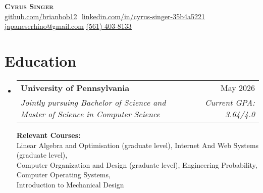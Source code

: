 \documentclass[letterpaper,11pt]{article}
\makeatletter
\newcommand{\resumeSubheading}[4]{
  \vspace{-2pt}\item
    \begin{tabular*}{0.97\textwidth}[t]{l@{\extracolsep{\fill}}r}
      \textbf{#1} & #2 \\
      \textit{\small#3} & \textit{\small #4} \\
    \end{tabular*}\vspace{-7pt}
}
\newcommand{\resumeSubHeadingListStart}{\begin{itemize}[leftmargin=0.15in, label={}]}
\newcommand{\resumeSubHeadingListEnd}{\end{itemize}}
\makeatother
\begin{document}
\hfill

\begin{center}
    \textbf{\Huge \scshape Cyrus Singer} \\ \vspace{8pt}
    \small 
    \href{https://github.com/brianbob12}{\underline{github.com/brianbob12}} $  $
    \href{https://www.linkedin.com/in/cyrus-singer-35b4a5221}{\underline{linkedin.com/in/cyrus-singer-35b4a5221}} $  $
    \href{mailto:japaneserhino@gmail.com}
    {\underline{japaneserhino@gmail.com}}
    \href{tel:561-403-8133}{\underline{(561) 403-8133}}
\end{center}

\section{Education}
  \resumeSubHeadingListStart
  
    \resumeSubheading
      {University of Pennsylvania}{May 2026}
      {Jointly pursuing Bachelor of Science and Master of Science in Computer Science}{Current GPA: 3.64/4.0}
      
      \vspace{5pt}

      \textbf{Relevant Courses:} \\
      \small{
        Linear Algebra and Optimisation (graduate level),
        Internet And Web Systems (graduate level), \\
        Computer Organization and Design (graduate level),
        Engineering Probability,
        Computer Operating Systems, \\
        Introduction to Mechanical Design
      }\\

  \resumeSubHeadingListEnd

\end{document}
